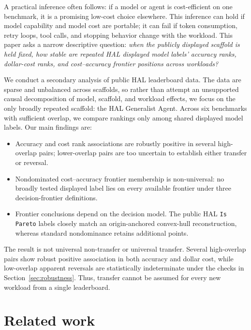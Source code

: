 \documentclass{article}
\begin{document}
A practical inference often follows: if a model or agent is cost-efficient on one benchmark, it is a promising low-cost choice elsewhere. This inference can hold if model capability and model cost are portable; it can fail if token consumption, retry loops, tool calls, and stopping behavior change with the workload. This paper asks a narrow descriptive question: \emph{when the publicly displayed scaffold is held fixed, how stable are repeated HAL displayed model labels' accuracy ranks, dollar-cost ranks, and cost--accuracy frontier positions across workloads?}

We conduct a secondary analysis of public HAL leaderboard data. The data are sparse and unbalanced across scaffolds, so rather than attempt an unsupported causal decomposition of model, scaffold, and workload effects, we focus on the only broadly repeated scaffold: the HAL Generalist Agent. Across six benchmarks with sufficient overlap, we compare rankings only among shared displayed model labels. Our main findings are:
\begin{itemize}[leftmargin=*,nosep]
    \item Accuracy and cost rank associations are robustly positive in several high-overlap pairs; lower-overlap pairs are too uncertain to establish either transfer or reversal.
    \item Nondominated cost--accuracy frontier membership is non-universal: no broadly tested displayed label lies on every available frontier under three decision-frontier definitions.
    \item Frontier conclusions depend on the decision model. The public HAL \texttt{Is Pareto} labels closely match an origin-anchored convex-hull reconstruction, whereas standard nondominance retains additional points.
\end{itemize}

The result is not universal non-transfer or universal transfer. Several high-overlap pairs show robust positive association in both accuracy and dollar cost, while low-overlap apparent reversals are statistically indeterminate under the checks in Section~\ref{sec:robustness}. Thus, transfer cannot be assumed for every new workload from a single leaderboard.

\section{Related work}
\end{document}
